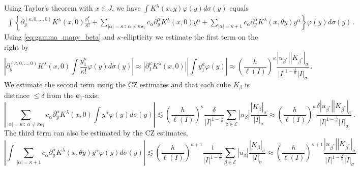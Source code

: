 \documentclass{amsart}%
\theoremstyle{plain}
\numberwithin{equation}{section}
\begin{document}
Using Taylor's theorem with $x \in J$, we have $\int K^{\lambda} (x,y) \varphi (y) d\sigma(y)$ equals 
\begin{align*}
	\int \left \{ \partial^{\left ( \kappa, 0, \ldots, 0 \right )} _y K ^{\lambda} (x,0) \frac{y_1^{\kappa}}{\kappa!}  +  \sum\limits_{|\alpha| = \kappa ~:~ \alpha \neq \kappa \mathbf{e}_1 } c_{\alpha} \partial^{\alpha} _y  K^{\lambda} (x,0) y^{\alpha} +  \sum\limits_{|\alpha| = \kappa +1 } c_{\alpha} \partial^{\alpha} _y  K ^{\lambda} (x,\theta y) y^{\alpha}\right \} \varphi (y) d \sigma(y) \, . 
\end{align*}
Using \eqref{eq:gamma_many_beta} and $\kappa$-ellipticity we estimate the first term on the right by 
\[
	\left | \partial^{\left ( \kappa, 0, \ldots, 0 \right )} _y K ^{\lambda} (x,0) \int  \frac{y_1^{\kappa}}{\kappa!} \varphi (y) d \sigma (y) \right |\approx \left | \partial^{\kappa} _1 K ^{\lambda} (x,0) \right | \left | \int   y_1^{\kappa} \varphi(y) \right | \approx  \left ( \frac{h}{\ell \left (I \right)} \right )^{\kappa} \frac{ \left | u_{\beta^*} \right | \left | K_{\beta^*} \right |_{\sigma}}{  \left |I \right |^{1 - \frac{\lambda}{n}} \left | I \right|_{\sigma}}   \, .
\]
 We estimate the second term using the CZ estimates and that each cube $K_{\beta}$ is distance $\leq \delta$ from the $\mathbf{e}_1$-axis: 
\[
	\left |  \sum\limits_{|\alpha| = \kappa ~:~ \alpha \neq \kappa \mathbf{e}_1 } c_{\alpha} \partial^{\alpha} _y  K ^{\lambda} (x,0) \int  y^{\alpha}\varphi (y)  d \sigma(y)     \right |	\lesssim \left ( \frac{h}{\ell \left (I \right)} \right )^{\kappa} \frac{\delta}{ \left |I \right |^{1 - \frac{\lambda}{n}} } \sum\limits_{\beta \in \mathcal{E}} \left | u_{\beta} \right |  \frac{\left | K_{\beta} \right |_{\sigma} }{  \left | I \right|_{\sigma} }   \approx \left ( \frac{h}{\ell \left (I \right)} \right )^{\kappa} \frac{\delta \left | u_{\beta^*} \right | \left | K_{\beta^*} \right |_{\sigma} }{ \left |I \right|^{1 - \frac{\lambda}{n}} \left | I \right |_{\sigma } }   \, .
\]
The third term can also be estimated by the CZ estimates, 
\[
	\left | \int \sum\limits_{|\alpha| = \kappa +1 } c_{\alpha} \partial^{\alpha} _y  K ^{\lambda} (x,\theta y) y^{\alpha} \varphi (y) d \sigma(y) \right | \lesssim \left ( \frac{h}{\ell \left (I \right)} \right )^{\kappa+1}  \frac{1}{ \left |I \right |^{1 - \frac{\lambda}{n}} } \sum\limits_{\beta \in \mathcal{E}} \left | u_{\beta} \right |  \frac{\left | K_{\beta} \right |_{\sigma} }{  \left | I \right|_{\sigma} }    \approx \left ( \frac{h}{\ell \left (I \right)} \right )^{\kappa+1} \frac{ \left | u_{\beta^*} \right | \left | K_{\beta^*} \right |_{\sigma} }{ \left |I \right|^{1 - \frac{\lambda}{n}} \left | I \right |_{\sigma } }  \]
\end{document}
